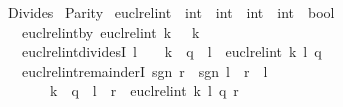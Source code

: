 %
\begin{isabellebody}%
%
%
\isadelimdocument
%
\endisadelimdocument
%
\isatagdocument
%
\isamarkuptrue%
%
\endisatagdocument
{\isafolddocument}%
%
\isadelimdocument
%
\endisadelimdocument
%
\isadelimtheory
%
\endisadelimtheory
%
\isatagtheory
{}\isamarkupfalse%
\ Divides\isanewline
{}\ Parity\isanewline
{}%
\endisatagtheory
{\isafoldtheory}%
%
\isadelimtheory
%
\endisadelimtheory
%
\isadelimdocument
%
\endisadelimdocument
%
\isatagdocument
%
\isamarkuptrue%
%
\endisatagdocument
{\isafolddocument}%
%
\isadelimdocument
%
\endisadelimdocument
{}\isamarkupfalse%
\ eucl{\isacharunderscore}{\kern0pt}rel{\isacharunderscore}{\kern0pt}int\ {\isacharcolon}{\kern0pt}{\isacharcolon}{\kern0pt}\ {\isachardoublequoteopen}int\ {\isasymRightarrow}\ int\ {\isasymRightarrow}\ int\ {\isasymtimes}\ int\ {\isasymRightarrow}\ bool{\isachardoublequoteclose}\isanewline
\ \ \ eucl{\isacharunderscore}{\kern0pt}rel{\isacharunderscore}{\kern0pt}int{\isacharunderscore}{\kern0pt}by{}{\isacharcolon}{\kern0pt}\ {\isachardoublequoteopen}eucl{\isacharunderscore}{\kern0pt}rel{\isacharunderscore}{\kern0pt}int\ k\ {}\ {\isacharparenleft}{\kern0pt}{}{\isacharcomma}{\kern0pt}\ k{\isacharparenright}{\kern0pt}{\isachardoublequoteclose}\isanewline
\ \ {\isacharbar}{\kern0pt}\ eucl{\isacharunderscore}{\kern0pt}rel{\isacharunderscore}{\kern0pt}int{\isacharunderscore}{\kern0pt}dividesI{\isacharcolon}{\kern0pt}\ {\isachardoublequoteopen}l\ {\isasymnoteq}\ {}\ {\isasymLongrightarrow}\ k\ {\isacharequal}{\kern0pt}\ q\ {\isacharasterisk}{\kern0pt}\ l\ {\isasymLongrightarrow}\ eucl{\isacharunderscore}{\kern0pt}rel{\isacharunderscore}{\kern0pt}int\ k\ l\ {\isacharparenleft}{\kern0pt}q{\isacharcomma}{\kern0pt}\ {}{\isacharparenright}{\kern0pt}{\isachardoublequoteclose}\isanewline
\ \ {\isacharbar}{\kern0pt}\ eucl{\isacharunderscore}{\kern0pt}rel{\isacharunderscore}{\kern0pt}int{\isacharunderscore}{\kern0pt}remainderI{\isacharcolon}{\kern0pt}\ {\isachardoublequoteopen}sgn\ r\ {\isacharequal}{\kern0pt}\ sgn\ l\ {\isasymLongrightarrow}\ {\isasymbar}r{\isasymbar}\ {\isacharless}{\kern0pt}\ {\isasymbar}l{\isasymbar}\isanewline
\ \ \ \ \ \ {\isasymLongrightarrow}\ k\ {\isacharequal}{\kern0pt}\ q\ {\isacharasterisk}{\kern0pt}\ l\ {\isacharplus}{\kern0pt}\ r\ {\isasymLongrightarrow}\ eucl{\isacharunderscore}{\kern0pt}rel{\isacharunderscore}{\kern0pt}int\ k\ l\ {\isacharparenleft}{\kern0pt}q{\isacharcomma}{\kern0pt}\ r{\isacharparenright}{\kern0pt}{\isachardoublequoteclose}\isanewline

\end{isabellebody}
